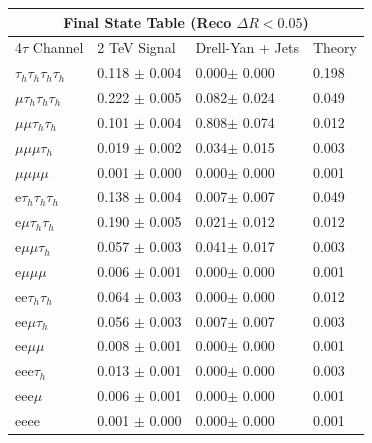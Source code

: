 \documentclass{article}
\begin{document}
 
\begin{landscape} 
\centering 
\begin{tabular}{|p{4.5cm}|p{3cm}|p{3cm}|p{3cm}|}\hline 
\multicolumn{4}{|c|}{Final State Table (Reco \(\Delta R < 0.05\))} \\ 
\hline 
4$\tau$ Channel & 2 TeV Signal & Drell-Yan + Jets & Theory \\ 
\hline 
$\tau_h$$\tau_h$$\tau_h$$\tau_h$ & 0.118 $\pm$ 0.004 & 0.000$\pm$ 0.000 & 0.198\\
\hline 
$\mu$$\tau_h$$\tau_h$$\tau_h$ & 0.222 $\pm$ 0.005 & 0.082$\pm$ 0.024 & 0.049\\
\hline 
$\mu$$\mu$$\tau_h$$\tau_h$ & 0.101 $\pm$ 0.004 & 0.808$\pm$ 0.074 & 0.012\\
\hline 
$\mu$$\mu$$\mu$$\tau_h$ & 0.019 $\pm$ 0.002 & 0.034$\pm$ 0.015 & 0.003\\
\hline 
$\mu$$\mu$$\mu$$\mu$ & 0.001 $\pm$ 0.000 & 0.000$\pm$ 0.000 & 0.001\\
\hline 
e$\tau_h$$\tau_h$$\tau_h$ & 0.138 $\pm$ 0.004 & 0.007$\pm$ 0.007 & 0.049\\
\hline 
e$\mu$$\tau_h$$\tau_h$ & 0.190 $\pm$ 0.005 & 0.021$\pm$ 0.012 & 0.012\\
\hline 
e$\mu$$\mu$$\tau_h$ & 0.057 $\pm$ 0.003 & 0.041$\pm$ 0.017 & 0.003\\
\hline 
e$\mu$$\mu$$\mu$ & 0.006 $\pm$ 0.001 & 0.000$\pm$ 0.000 & 0.001\\
\hline 
ee$\tau_h$$\tau_h$ & 0.064 $\pm$ 0.003 & 0.000$\pm$ 0.000 & 0.012\\
\hline 
ee$\mu$$\tau_h$ & 0.056 $\pm$ 0.003 & 0.007$\pm$ 0.007 & 0.003\\
\hline 
ee$\mu$$\mu$ & 0.008 $\pm$ 0.001 & 0.000$\pm$ 0.000 & 0.001\\
\hline 
eee$\tau_h$ & 0.013 $\pm$ 0.001 & 0.000$\pm$ 0.000 & 0.003\\
\hline 
eee$\mu$ & 0.006 $\pm$ 0.001 & 0.000$\pm$ 0.000 & 0.001\\
\hline 
eeee & 0.001 $\pm$ 0.000 & 0.000$\pm$ 0.000 & 0.001\\
\hline 
\end{tabular} 
\end{landscape} 
\end{document}
